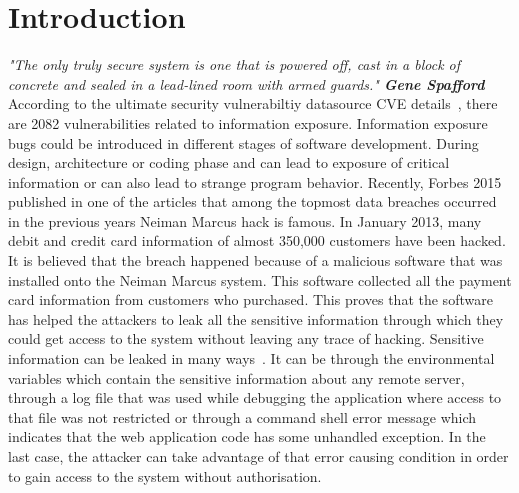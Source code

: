 
\chapter{Introduction}
\label{chapter:Introduction}


\textit{"The only truly secure system is one that is powered off, cast in a block of concrete 
and sealed in a lead-lined room with armed guards."
\textemdash  \textbf{ Gene Spafford}} \\

According to the ultimate security vulnerabiltiy datasource CVE details~\cite{cve:details},
there are 2082 vulnerabilities related to information exposure. Information exposure bugs could be introduced
in different stages of software development. During design, architecture or coding phase and
can lead to exposure of critical information or can also lead to strange program behavior.
Recently, Forbes 2015~\cite{forbes:bill} published in one of the articles that
among the topmost data breaches occurred in the 
previous years Neiman Marcus hack is famous.
In January 2013, many debit and credit card information of almost 350,000 customers have been
hacked. It is believed that the breach happened because of a malicious software
that was installed onto the Neiman Marcus system. This software collected all the payment
card information from customers who purchased.
This proves that the software has helped the attackers to leak all the sensitive information
through which they could get access to the system without leaving any trace of hacking.
Sensitive information can be leaked in many ways~\cite{mitre:CWE}. It can be through the environmental variables 
which contain the sensitive information about any remote server, through a log file that was
used while debugging the application where access to that file was not restricted or through a
command shell error message which indicates that the web application code has some unhandled exception.
In the last case, the attacker can take advantage of that error causing
condition in order to gain access to the system without authorisation.



